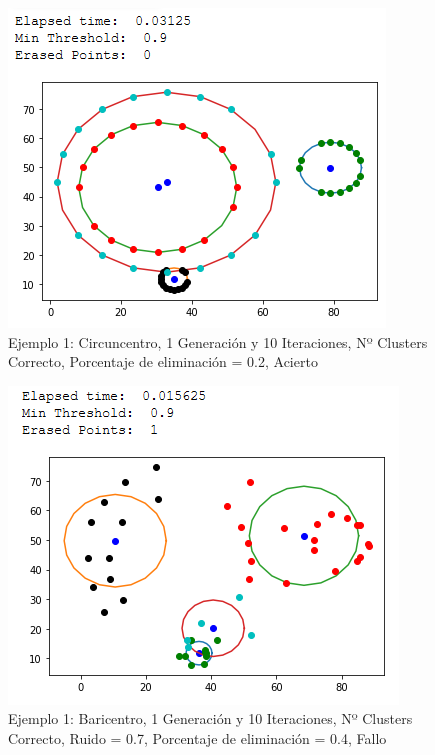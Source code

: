 \documentclass[conference,a4paper]{IEEEtran}
\begin{document}
\begin{figure}[H]
\centering
\includegraphics[scale=0.65]{Experimentacion/Ejemplo1/ej1_c_1_10_le}
\caption{Ejemplo 1: Circuncentro, 1 Generación y 10 Iteraciones,  Nº Clusters Correcto, Porcentaje de eliminación = 0.2, Acierto\\}
\end{figure}

\begin{figure}[H]
\centering
\includegraphics[scale=0.65]{Experimentacion/Ejemplo1/ej1_b_1_10_re}
\caption{Ejemplo 1: Baricentro, 1 Generación y 10 Iteraciones,  Nº Clusters Correcto, Ruido = 0.7, Porcentaje de eliminación = 0.4, Fallo\\}
\end{figure}
\end{document}

